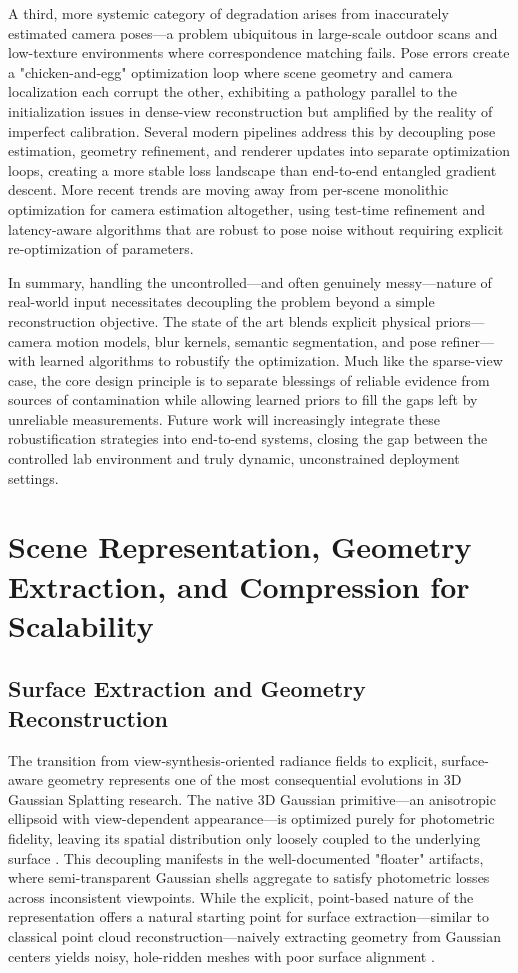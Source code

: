 \documentclass[11pt,a4paper]{article}
\begin{document}
A third, more systemic category of degradation arises from inaccurately estimated camera poses---a problem ubiquitous in large-scale outdoor scans and low-texture environments where correspondence matching fails. Pose errors create a "chicken-and-egg" optimization loop where scene geometry and camera localization each corrupt the other, exhibiting a pathology parallel to the initialization issues in dense-view reconstruction but amplified by the reality of imperfect calibration. Several modern pipelines address this by decoupling pose estimation, geometry refinement, and renderer updates into separate optimization loops, creating a more stable loss landscape than end-to-end entangled gradient descent. More recent trends are moving away from per-scene monolithic optimization for camera estimation altogether, using test-time refinement and latency-aware algorithms that are robust to pose noise without requiring explicit re-optimization of parameters.

In summary, handling the uncontrolled---and often genuinely messy---nature of real-world input necessitates decoupling the problem beyond a simple reconstruction objective. The state of the art blends explicit physical priors---camera motion models, blur kernels, semantic segmentation, and pose refiner---with learned algorithms to robustify the optimization. Much like the sparse-view case, the core design principle is to separate blessings of reliable evidence from sources of contamination while allowing learned priors to fill the gaps left by unreliable measurements. Future work will increasingly integrate these robustification strategies into end-to-end systems, closing the gap between the controlled lab environment and truly dynamic, unconstrained deployment settings.


\section{Scene Representation, Geometry Extraction, and Compression for Scalability}



\subsection{Surface Extraction and Geometry Reconstruction}


The transition from view-synthesis-oriented radiance fields to explicit, surface-aware geometry represents one of the most consequential evolutions in 3D Gaussian Splatting research. The native 3D Gaussian primitive---an anisotropic ellipsoid with view-dependent appearance---is optimized purely for photometric fidelity, leaving its spatial distribution only loosely coupled to the underlying surface \cite{arxiv:2401.03890v2,arxiv:2407.17418v1}. This decoupling manifests in the well-documented "floater" artifacts, where semi-transparent Gaussian shells aggregate to satisfy photometric losses across inconsistent viewpoints. While the explicit, point-based nature of the representation offers a natural starting point for surface extraction---similar to classical point cloud reconstruction---naively extracting geometry from Gaussian centers yields noisy, hole-ridden meshes with poor surface alignment \cite{arxiv:2404.01810v1}.
\end{document}
